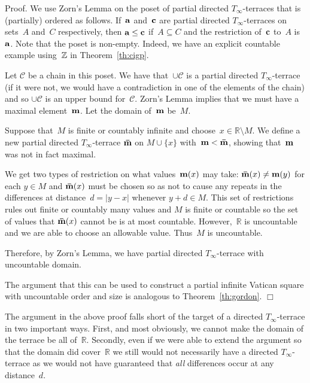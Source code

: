 \documentclass[12pt,a4paper]{article}
\newcommand{\Z}{\mathbb{Z}}
\newcommand{\R}{\mathbb{R}}
\newcommand{\qed}{\unskip\protect\nolinebreak\mbox{\quad$\Box$}\vspace{3mm}}
\begin{document}
\noindent
Proof.  We use Zorn's Lemma on the poset of partial directed $T_{\infty}$-terraces that is (partially) ordered as follows.  If~${\bf a}$ and~${\bf c}$ are partial  directed $T_{\infty}$-terraces on sets~$A$ and~$C$ respectively, then ${\bf a} \leq {\bf c}$ if~$A \subseteq C$ and the restriction of~${\bf c}$ to~$A$ is~${\bf a}$.  Note that the poset is non-empty.  Indeed, we have an explicit countable example using~${\bf \Z}$ in Theorem~\ref{th:cigp}.

Let $\mathcal{C}$ be a chain in this poset.   We have that~$\cup \mathcal{C}$ is a partial directed $T_{\infty}$-terrace (if it were not, we would have a contradiction in one of the elements of the chain) and so $\cup \mathcal{C}$  is an upper bound for~$\mathcal{C}$.  Zorn's Lemma implies that we must have a maximal element~${\bf m}$.  Let the domain of~${\bf m}$ be~$M$.

Suppose that~$M$ is finite or countably infinite and choose~$x \in \R \setminus M$.  We define a new partial directed $T_{\infty}$-terrace ${\bf \bar{m}}$ on $M \cup \{ x \}$ with~${\bf m} < {\bf \bar{m}}$, showing that~${\bf m}$ was not in fact maximal.

We get two types of restriction on what values~${\bf m}(x)$
may take: ${\bf \bar{m}}(x) \neq {\bf m}(y)$ for each $y \in M$ and ${\bf \bar{m}}(x)$ must be chosen so as not to cause any repeats in the differences at distance~$d = |y-x|$ whenever $y+d \in M$.   
This set of restrictions rules out finite or countably many values and $M$ is finite or countable so the set of values that ${\bf \bar{m}}(x)$ cannot be is at most countable.  However,~$\R$ is uncountable and we are able to choose an allowable value.  Thus~$M$ is uncountable.

Therefore, by Zorn's Lemma, we have  partial directed $T_{\infty}$-terrace with uncountable domain.

The argument that this can be used to construct a partial infinite Vatican square with uncountable order and size is analogous to Theorem~\ref{th:gordon}.
\qed

The argument in the above proof falls short of the target of a directed $T_{\infty}$-terrace in two important ways.  First, and most obviously, we cannot make the domain of the terrace be all of~$\R$.  Secondly, even if we were able to extend the argument so that the domain did cover~$\R$ we still would not necessarily have a 
directed $T_{\infty}$-terrace as we would not have guaranteed that {\em all} differences occur at any distance~$d$.
\end{document}

